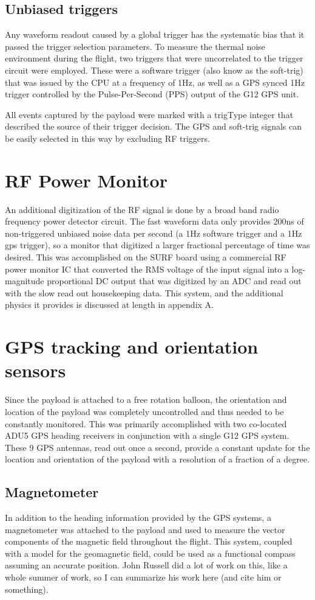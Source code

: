 	\subsection{Unbiased triggers}
		Any waveform readout caused by a global trigger has the systematic bias that it passed the trigger selection parameters.  To measure the thermal noise environment during the flight, two triggers that were uncorrelated to the trigger circuit were employed.  These were a software trigger (also know as the soft-trig) that was issued by the CPU at a frequency of 1Hz, as well as a GPS synced 1Hz trigger controlled by the Pulse-Per-Second (PPS) output of the G12 GPS unit.
		
		All events captured by the payload were marked with a trigType integer that described the source of their trigger decision.  The GPS and soft-trig signals can be easily selected in this way by excluding RF triggers.
		
		
\section{RF Power Monitor}
	An additional digitization of the RF signal is done by a broad band radio frequency power detector circuit.  The fast waveform data only provides 200ns of non-triggered unbiased noise data per second (a 1Hz software trigger and a 1Hz gps trigger), so a monitor that digitized a larger fractional percentage of time was desired.  This was accomplished on the SURF board using a commercial RF power monitor IC that converted the RMS voltage of the input signal into a log-magnitude proportional DC output that was digitized by an ADC and read out with the slow read out housekeeping data.  This system, and the additional physics it provides is discussed at length in appendix A.

	
\section{GPS tracking and orientation sensors}
	Since the payload is attached to a free rotation balloon, the orientation and location of the payload was completely uncontrolled and thus needed to be constantly monitored.  This was primarily accomplished with two co-located ADU5 GPS heading receivers in conjunction with a single G12 GPS system.  These 9 GPS antennas, read out once a second, provide a constant update for the location and orientation of the payload with a resolution of a fraction of a degree.
	\subsection{Magnetometer}
		In addition to the heading information provided by the GPS systems, a magnetometer was attached to the payload and used to measure the vector components of the magnetic field throughout the flight.  This system, coupled with a model for the geomagnetic field, could be used as a functional compass assuming an accurate position.  John Russell did a lot of work on this, like a whole summer of work, so I can summarize his work here (and cite him or something).

